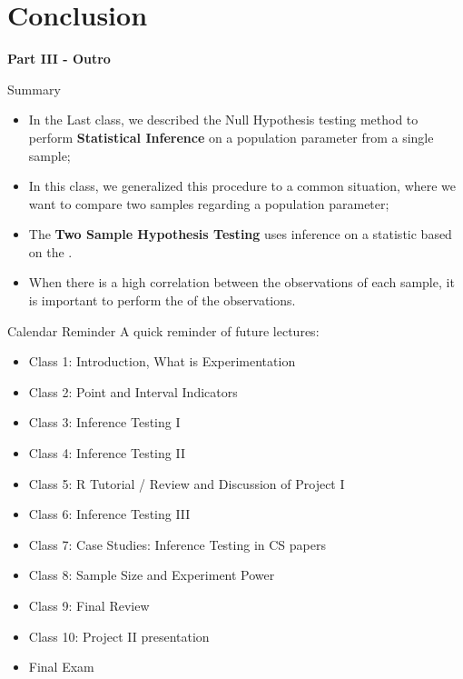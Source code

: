 \section{Conclusion}
\begin{frame}
  \begin{center}
    {\bf Part III - Outro}
  \end{center}
\end{frame}

\begin{frame}{Summary}
  \begin{itemize}
    \item In the Last class, we described the Null Hypothesis testing method to perform {\bf Statistical Inference} on a population parameter from a single sample;
    \bigskip

    \item In this class, we generalized this procedure to a common situation, where we want to compare two samples regarding a population parameter;
    \bigskip

    \item The {\bf Two Sample Hypothesis Testing} uses inference on a statistic based on the .\bigskip

    \item When there is a high correlation between the observations of each sample, it is important to perform the  of the observations.
  \end{itemize}
\end{frame}

\begin{frame}{Calendar Reminder}
  A quick reminder of future lectures:
  \begin{itemize}
    \item Class 1: Introduction, What is Experimentation
    \item Class 2: Point and Interval Indicators
    \item Class 3: Inference Testing I
    \item \alert{Class 4}: Inference Testing II
    \item Class 5: R Tutorial / Review and Discussion of Project I
    \item Class 6: Inference Testing III
    \item Class 7: Case Studies: Inference Testing in CS papers
    \item Class 8: Sample Size and Experiment Power
    \item Class 9: Final Review
    \item Class 10: Project II presentation
    \item \alert{Final Exam}
  \end{itemize}
\end{frame}

